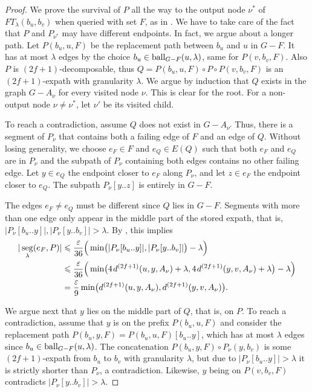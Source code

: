 \documentclass{theoretics}
\DeclareMathOperator{\seg}{seg}
\newcommand*{\length}[1]{|#1|}
\newcommand*{\ball}{\mbox{\rm ball}}
\newcommand*{\nwspace}{\hspace*{.1em}}
\renewcommand{\le}{\leqslant}
\newcommand{\eps}{\varepsilon}
\begin{document}
\begin{proof}
We prove the survival of $P$ all the way to the output node $\nu^*$ of $FT_{\lambda}(b_u,b_v)$
when queried with set $F$, as in .
We have to take care of the fact that $P$ and $P_{\nu^*}$
may have different endpoints.
In fact, we argue about a longer path.
Let $P(b_u,u,F)$ be the replacement path between $b_u$ and $u$ in $G{-}F$.
It has at most $\lambda$ edges by the choice $b_u \in \ball_{G-F}(u,\lambda)$,
same for $P(v,b_v,F)$.
Also $P$ is $(2f{+}1)$-decomposable, thus $Q = P(b_u,u,F) \circ P \circ  P(v,b_v,F)$
is an $(2f{+}1)$-expath with granularity $\lambda$.
We argue by induction that $Q$ exists in the graph $G{-}A_{\nu}$ for every visited node $\nu$.
This is clear for the root.
For a non-output node $\nu \neq \nu^*$, let $\nu'$ be its visited child.

To reach a contradiction, assume $Q$ does not exist in $G-A_{\nu'}$
Thus, there is a segment of
$P_{\nu}$ that contains both a failing edge of $F$ and an edge of $Q$.
Without losing generality,
we choose $e_F \in F$ and $e_Q \in E(Q)$ such that both $e_F$ and $e_Q$ are in $P_\nu$
and the subpath of $P_\nu$ containing both edges contains no other failing edge.
Let $y \in e_Q$ the endpoint closer to $e_F$ along $P_\nu$,
and let $z \in e_F$ the endpoint closer to $e_Q$. 
The subpath $P_\nu[y..z]$ is entirely in $G-F$.

The edges $e_F \ne e_Q$ must be different since $Q$ lies in $G{-}F$.
Segments with more than one edge only appear in the middle part of the stored expath, that is,
$\length{P_\nu[b_u..y]},\length{P_\nu[y..b_v]} > \lambda$.
By , this implies
\begin{align*}
	\length{\seg_{\lambda}(e_F,P)}  
  		&\le \frac{\eps}{36} \Big(\min\!\big(\length{P_\nu[b_u..y]}, \length{P_\nu[y..b_v]} \big) - \lambda \Big)\\
  		&\le \frac{\eps}{36} \Big(\min\!\big(4 \nwspace d^{(2f+1)}(u,y,A_{\nu})+\lambda,
  			4 \nwspace d^{(2f+1)}(y,v,A_{\nu}) + \lambda \big) - \lambda \Big)\\
  		&= \frac{\varepsilon}{9} \min\!\big(d^{(2f+1)}(u,y,A_{\nu}), d^{(2f+1)}(y,v,A_{\nu})\big).
\end{align*}

We argue next that $y$ lies on the middle part of $Q$, that is, on $P$.
To reach a contradiction, assume that $y$ is on the prefix $P(b_u,u,F)$
and consider the replacement path $P(b_u,y,F) = P(b_u,u,F)[b_u..y]$,
which has at most $\lambda$ edges since $b_u \in \ball_{G-F}(u,\lambda)$.
The concatenation $P(b_u,y,F) \circ P_\nu(y,b_v)$ is some $(2f{+}1)$-expath from
$b_u$ to $b_v$ with granularity $\lambda$,
but due to $|P_\nu[b_u..y]| > \lambda$ it is strictly shorter than $P_\nu$, a contradiction.
Likewise, $y$ being on $P(v,b_v,F)$ contradicts $|P_{\nu}[y..b_v]| > \lambda$.


\end{proof}
\end{document}
